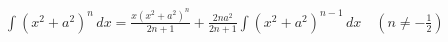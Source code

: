 \item $\displaystyle\int (x^2 + a^2)^n \, dx = \frac{x(x^2 + a^2)^n}{2n + 1} + \frac{2na^2}{2n + 1} \int (x^2 + a^2)^{n-1} \, dx \quad \left(n \ne -\frac{1}{2}\right)$
